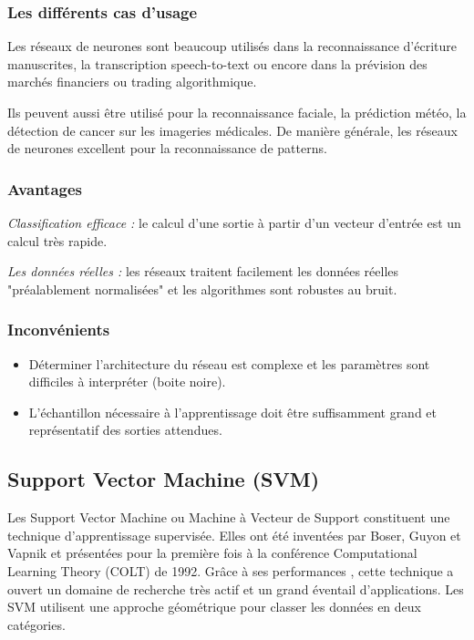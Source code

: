 \subsubsection{Les différents cas d'usage}

Les réseaux de neurones sont beaucoup utilisés dans la reconnaissance d'écriture
manuscrites, la transcription \og speech-to-text \fg ou encore dans la
prévision des marchés financiers ou trading algorithmique.

Ils peuvent aussi être utilisé pour la reconnaissance faciale, la prédiction
météo, la détection de cancer sur les imageries médicales. De manière générale,
les réseaux de neurones excellent pour la reconnaissance de patterns.

\subsubsection{Avantages}
\begin{description}
  \item{\textit{Classification efficace :}} le calcul d'une sortie à partir d'un 
    vecteur d'entrée est un calcul très rapide.
  \item{\textit{Les données réelles :}} les réseaux traitent facilement les données 
      réelles "préalablement normalisées" et les algorithmes sont robustes au bruit.
  \end{description}

\subsubsection{Inconvénients}
\begin{itemize}
  \item Déterminer l’architecture du réseau est complexe et les
    paramètres sont difficiles à interpréter (boite noire).
    \item L'échantillon nécessaire à l'apprentissage doit être
      suffisamment grand et représentatif des sorties attendues.
  \end{itemize}

\subsection{Support Vector Machine (SVM)}
Les Support Vector Machine ou Machine à Vecteur de Support constituent une 
technique d’apprentissage supervisée. Elles ont été inventées par Boser, 
Guyon et Vapnik \cite{10.1145/130385.130401} et présentées pour la première
fois à la conférence Computational Learning Theory (COLT) de 1992.
Grâce à ses performances \cite{Cortes1995}, cette technique a ouvert un domaine de 
recherche très actif et un grand éventail d’applications. Les SVM utilisent
une approche géométrique pour classer les données en deux catégories.


